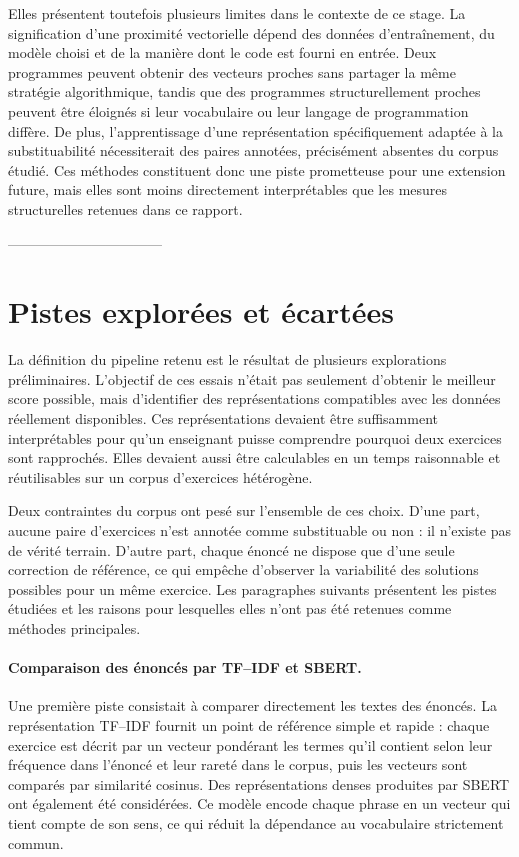 Elles présentent toutefois plusieurs limites dans le contexte de ce stage.
La signification d'une proximité vectorielle dépend des données d'entraînement,
du modèle choisi et de la manière dont le code est fourni en entrée. Deux
programmes peuvent obtenir des vecteurs proches sans partager la même
stratégie algorithmique, tandis que des programmes structurellement proches
peuvent être éloignés si leur vocabulaire ou leur langage de programmation
diffère. De plus, l'apprentissage d'une représentation spécifiquement adaptée
à la substituabilité nécessiterait des paires annotées, précisément absentes du
corpus étudié. Ces méthodes constituent donc une piste prometteuse pour une
extension future, mais elles sont moins directement interprétables que les
mesures structurelles retenues dans ce rapport.


---------------------------------


\section{Pistes explorées et écartées}

La définition du pipeline retenu est le résultat de plusieurs explorations
préliminaires. L'objectif de ces essais n'était pas seulement d'obtenir le
meilleur score possible, mais d'identifier des représentations compatibles
avec les données réellement disponibles. Ces représentations devaient être
suffisamment interprétables pour qu'un enseignant puisse comprendre pourquoi
deux exercices sont rapprochés. Elles devaient aussi être calculables en un
temps raisonnable et réutilisables sur un corpus d'exercices hétérogène.

Deux contraintes du corpus ont pesé sur l'ensemble de ces choix. D'une part,
aucune paire d'exercices n'est annotée comme substituable ou non : il n'existe
pas de vérité terrain. D'autre part, chaque énoncé ne dispose que d'une seule
correction de référence, ce qui empêche d'observer la variabilité des
solutions possibles pour un même exercice. Les paragraphes suivants présentent
les pistes étudiées et les raisons pour lesquelles elles n'ont pas été
retenues comme méthodes principales.

\paragraph{Comparaison des énoncés par TF--IDF et SBERT.}

Une première piste consistait à comparer directement les textes des énoncés.
La représentation TF--IDF fournit un point de référence simple et rapide :
chaque exercice est décrit par un vecteur pondérant les termes qu'il contient
selon leur fréquence dans l'énoncé et leur rareté dans le corpus, puis les
vecteurs sont comparés par similarité cosinus. Des représentations denses
produites par SBERT ont également été considérées. Ce modèle encode chaque
phrase en un vecteur qui tient compte de son sens, ce qui réduit la
dépendance au vocabulaire strictement commun.

